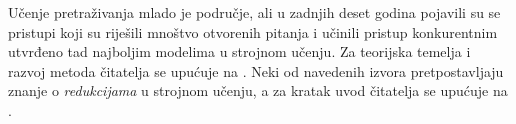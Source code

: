Učenje pretraživanja mlado je područje, ali u zadnjih deset godina pojavili su
se pristupi koji su riješili mnoštvo otvorenih pitanja i učinili pristup
konkurentnim utvrđeno tad najboljim modelima u strojnom učenju. Za teorijska
temelja i razvoj \lts{} metoda čitatelja se upućuje na
\citep{collins2004incremental, daume2005learning, daume09searn, ross2011no,
doppa2014hc, ross2014reinforcement, daume15lols, andor2016globally}. Neki od
navedenih izvora pretpostavljaju znanje o \textit{redukcijama} u strojnom
učenju, a za kratak uvod čitatelja se upućuje na \citep{beygelzimer2005error,
daume15reductions}.
